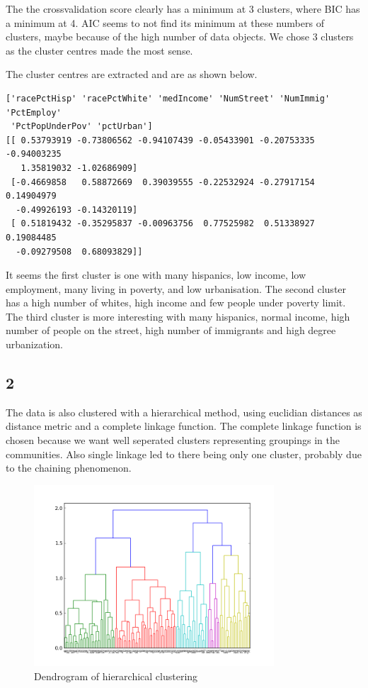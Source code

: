 \documentclass[a4paper,10pt]{article}
\begin{document}
The the crossvalidation score clearly has a minimum at 3 clusters, where BIC has a minimum at 4. AIC seems to not find its minimum at these numbers of clusters, maybe because of the high number of data objects. We chose 3 clusters as the cluster centres made the most sense.

The cluster centres are extracted and are as shown below.
\begin{verbatim}
['racePctHisp' 'racePctWhite' 'medIncome' 'NumStreet' 'NumImmig' 'PctEmploy'
 'PctPopUnderPov' 'pctUrban']
[[ 0.53793919 -0.73806562 -0.94107439 -0.05433901 -0.20753335 -0.94003235
   1.35819032 -1.02686909]
 [-0.4669858   0.58872669  0.39039555 -0.22532924 -0.27917154  0.14904979
  -0.49926193 -0.14320119]
 [ 0.51819432 -0.35295837 -0.00963756  0.77525982  0.51338927  0.19084485
  -0.09279508  0.68093829]]
\end{verbatim}
It seems the first cluster is one with many hispanics, low income, low employment, many living in poverty, and low urbanisation. The second cluster has a high number of whites, high income and few people under poverty limit. The third cluster is more interesting with many hispanics, normal income, high number of people on the street, high number of immigrants and high degree urbanization.

\subsection{2}
The data is also clustered with a hierarchical method, using euclidian distances as distance metric and a complete linkage function. The complete linkage function is chosen because we want well seperated clusters representing groupings in the communities. Also single linkage led to there being only one cluster, probably due to the chaining phenomenon.

\begin{figure}[h]
\centering
\includegraphics[h, width=0.8\textwidth]{figure_3}
\caption{Dendrogram of hierarchical clustering}
\end{figure}
\end{document}
